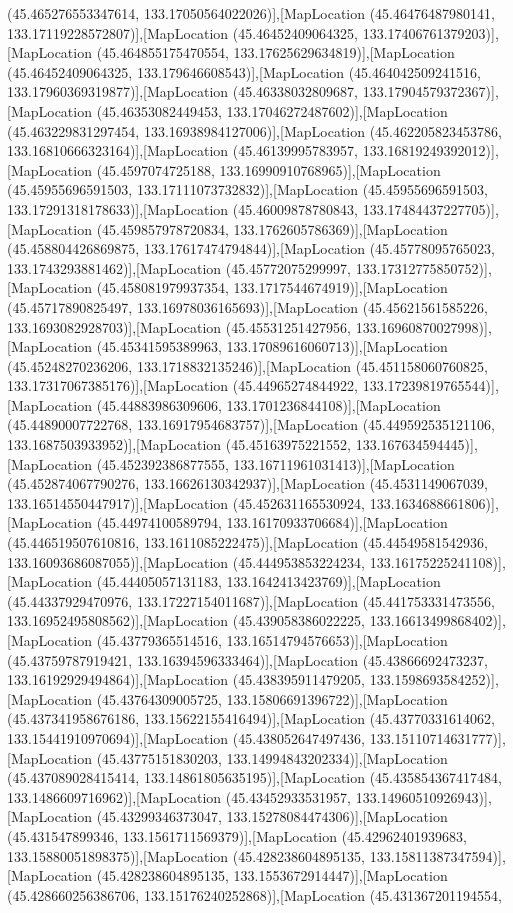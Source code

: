(45.465276553347614, 133.17050564022026)],[MapLocation (45.46476487980141, 133.17119228572807)],[MapLocation (45.46452409064325, 133.17406761379203)],[MapLocation (45.464855175470554, 133.17625629634819)],[MapLocation (45.46452409064325, 133.179646608543)],[MapLocation (45.464042509241516, 133.17960369319877)],[MapLocation (45.46338032809687, 133.17904579372367)],[MapLocation (45.46353082449453, 133.17046272487602)],[MapLocation (45.463229831297454, 133.16938984127006)],[MapLocation (45.462205823453786, 133.16810666323164)],[MapLocation (45.46139995783957, 133.16819249392012)],[MapLocation (45.4597074725188, 133.16990910768965)],[MapLocation (45.45955696591503, 133.17111073732832)],[MapLocation (45.45955696591503, 133.17291318178633)],[MapLocation (45.46009878780843, 133.17484437227705)],[MapLocation (45.459857978720834, 133.1762605786369)],[MapLocation (45.458804426869875, 133.17617474794844)],[MapLocation (45.45778095765023, 133.1743293881462)],[MapLocation (45.45772075299997, 133.17312775850752)],[MapLocation (45.458081979937354, 133.1717544674919)],[MapLocation (45.45717890825497, 133.16978036165693)],[MapLocation (45.45621561585226, 133.1693082928703)],[MapLocation (45.45531251427956, 133.16960870027998)],[MapLocation (45.45341595389963, 133.17089616060713)],[MapLocation (45.45248270236206, 133.1718832135246)],[MapLocation (45.451158060760825, 133.17317067385176)],[MapLocation (45.44965274844922, 133.17239819765544)],[MapLocation (45.44883986309606, 133.1701236844108)],[MapLocation (45.44890007722768, 133.16917954683757)],[MapLocation (45.449592535121106, 133.1687503933952)],[MapLocation (45.45163975221552, 133.167634594445)],[MapLocation (45.452392386877555, 133.16711961031413)],[MapLocation (45.452874067790276, 133.16626130342937)],[MapLocation (45.4531149067039, 133.16514550447917)],[MapLocation (45.452631165530924, 133.1634688661806)],[MapLocation (45.44974100589794, 133.16170933706684)],[MapLocation (45.446519507610816, 133.1611085222475)],[MapLocation (45.44549581542936, 133.16093686087055)],[MapLocation (45.444953853224234, 133.16175225241108)],[MapLocation (45.44405057131183, 133.1642413423769)],[MapLocation (45.44337929470976, 133.17227154011687)],[MapLocation (45.441753331473556, 133.16952495808562)],[MapLocation (45.439058386022225, 133.16613499868402)],[MapLocation (45.43779365514516, 133.16514794576653)],[MapLocation (45.43759787919421, 133.16394596333464)],[MapLocation (45.43866692473237, 133.16192929494864)],[MapLocation (45.438395911479205, 133.1598693584252)],[MapLocation (45.43764309005725, 133.15806691396722)],[MapLocation (45.437341958676186, 133.15622155416494)],[MapLocation (45.43770331614062, 133.15441910970694)],[MapLocation (45.438052647497436, 133.15110714631777)],[MapLocation (45.43775151830203, 133.14994843202334)],[MapLocation (45.437089028415414, 133.14861805635195)],[MapLocation (45.435854367417484, 133.1486609716962)],[MapLocation (45.43452933531957, 133.14960510926943)],[MapLocation (45.43299346373047, 133.15278084474306)],[MapLocation (45.431547899346, 133.1561711569379)],[MapLocation (45.42962401939683, 133.15880051898375)],[MapLocation (45.428238604895135, 133.15811387347594)],[MapLocation (45.428238604895135, 133.1553672914447)],[MapLocation (45.428660256386706, 133.15176240252868)],[MapLocation (45.431367201194554, 